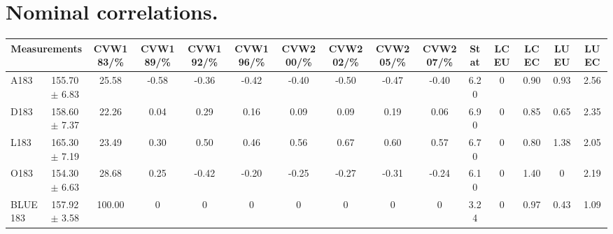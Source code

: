 \section{Nominal correlations.}
\begin{table}[H]
\scriptsize
\begin{center}
\renewcommand{\arraystretch}{1.1}
\begin{tabular}{|lc|c|c|c|c|c|c|c|c|ccccc|}
\hline
\multicolumn{2}{|c|}{Measurements} & CVW{\tiny 183}/\%  & CVW{\tiny 189}/\%  & CVW{\tiny 192}/\%  & CVW{\tiny 196}/\%  & CVW{\tiny 200}/\%  & CVW{\tiny 202}/\%  & CVW{\tiny 205}/\%  & CVW{\tiny 207}/\%  & {\tiny Stat} & {\tiny LCEU} & {\tiny LCEC} & {\tiny LUEU} & {\tiny LUEC}\\
\hline
A183 &     155.70 $\pm$       6.83 &      25.58 &      -0.58 &      -0.36 &      -0.42 &      -0.40 &      -0.50 &      -0.47 &      -0.40 &       6.20 &  0 &       0.90 &       0.93 &       2.56\\
D183 &     158.60 $\pm$       7.37 &      22.26 &       0.04 &       0.29 &       0.16 &       0.09 &       0.09 &       0.19 &       0.06 &       6.90 &  0 &       0.85 &       0.65 &       2.35\\
L183 &     165.30 $\pm$       7.19 &      23.49 &       0.30 &       0.50 &       0.46 &       0.56 &       0.67 &       0.60 &       0.57 &       6.70 &  0 &       0.80 &       1.38 &       2.05\\
O183 &     154.30 $\pm$       6.63 &      28.68 &       0.25 &      -0.42 &      -0.20 &      -0.25 &      -0.27 &      -0.31 &      -0.24 &       6.10 &  0 &       1.40 &  0 &       2.19\\
\hline
BLUE {\tiny 183} &     157.92 $\pm$       3.58 &     100.00 &  0 &  0 &  0 &  0 &  0 &  0 &  0 &       3.24 &  0 &       0.97 &       0.43 &       1.09\\
\hline
\end{tabular}
\renewcommand{\arraystretch}{1}
\end{center}
\end{table}
\vspace*{-0.5cm}
